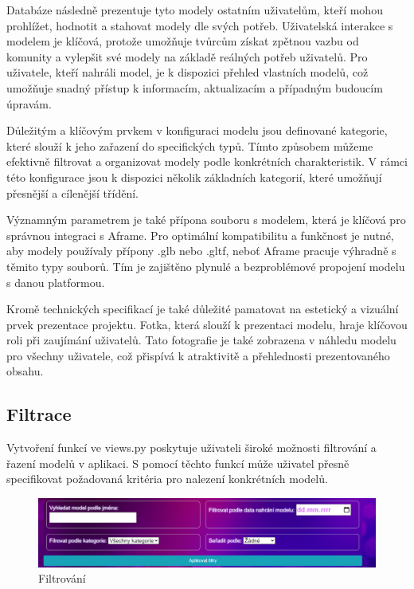 \documentclass[12pt, a4paper,
twoside,        %
openright
]{report}
\begin{document}
	Databáze následně prezentuje tyto modely ostatním uživatelům, kteří mohou prohlížet, hodnotit a stahovat modely dle svých potřeb. Uživatelská interakce s modelem je klíčová, protože umožňuje tvůrcům získat zpětnou vazbu od komunity a vylepšit své modely na základě reálných potřeb uživatelů. Pro uživatele, kteří nahráli model, je k dispozici přehled vlastních modelů, což umožňuje snadný přístup k informacím, aktualizacím a případným budoucím úpravám. 
	
Důležitým a klíčovým prvkem v konfiguraci modelu jsou definované kategorie, které slouží k jeho zařazení do specifických typů. Tímto způsobem můžeme efektivně filtrovat a organizovat modely podle konkrétních charakteristik. V rámci této konfigurace jsou k dispozici několik základních kategorií, které umožňují přesnější a cílenější třídění.


Významným parametrem je také přípona souboru s modelem, která je klíčová pro správnou integraci s Aframe. Pro optimální kompatibilitu a funkčnost je nutné, aby modely používaly přípony .glb nebo .gltf, neboť Aframe pracuje výhradně s těmito typy souborů. Tím je zajištěno plynulé a bezproblémové propojení modelu s danou platformou.

Kromě technických specifikací je také důležité pamatovat na estetický a vizuální prvek prezentace projektu. Fotka, která slouží k prezentaci modelu, hraje klíčovou roli při zaujímání uživatelů. Tato fotografie je také zobrazena v náhledu modelu pro všechny uživatele, což přispívá k atraktivitě a přehlednosti prezentovaného obsahu.

	
	\newpage	
	\subsection[Filtrace]{Filtrace}
	
	Vytvoření funkcí ve views.py poskytuje uživateli široké možnosti filtrování a řazení modelů v aplikaci. S pomocí těchto funkcí může uživatel přesně specifikovat požadovaná kritéria pro nalezení konkrétních modelů.
	\begin{figure}[h]
			\centering
			\includegraphics[width=1\linewidth]{image/Filtrace.png} 
			\caption{Filtrování}
	\end{figure}
\end{document}
